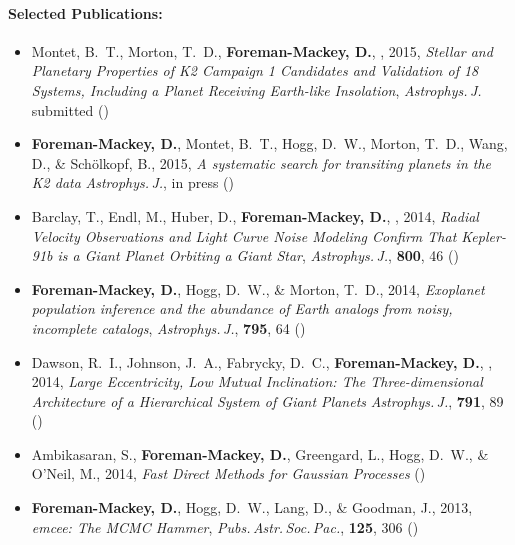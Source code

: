 \documentclass[12pt]{article}
\begin{document}
\paragraph{Selected Publications:}
\begin{itemize}\setlength{\itemsep}{0pt}

\item Montet, B.~T., Morton, T.~D., {\bf Foreman-Mackey, D.}, \etal, 2015,
    \emph{Stellar and Planetary Properties of K2 Campaign 1 Candidates and
          Validation of 18 Systems, Including a Planet Receiving Earth-like
          Insolation}, \textit{Astrophys.\,J.} submitted ()

\item {\bf Foreman-Mackey, D.}, Montet, B.~T., Hogg, D.~W., Morton, T.~D.,
    Wang, D., \& Sch\"olkopf, B., 2015,
    \emph{A systematic search for transiting planets in the K2 data}
    \textit{Astrophys.\,J.}, in press ()

\item Barclay, T., Endl, M.,  Huber, D., {\bf Foreman-Mackey, D.}, \etal, 2014,
    \emph{Radial Velocity Observations and Light Curve Noise Modeling Confirm
          That Kepler-91b is a Giant Planet Orbiting a Giant Star},
    \textit{Astrophys.\,J.}, \textbf{800}, 46 ()

\item {\bf Foreman-Mackey, D.}, Hogg, D.~W., \& Morton, T.~D., 2014,
    \emph{Exoplanet population inference and the abundance of Earth analogs
          from noisy, incomplete catalogs},
    \textit{Astrophys.\,J.}, \textbf{795}, 64 ()

\item Dawson, R.~I., Johnson,  J.~A., Fabrycky, D.~C.,
    {\bf Foreman-Mackey, D.}, \etal, 2014,
    \emph{Large Eccentricity, Low Mutual Inclination: The Three-dimensional
          Architecture of a Hierarchical System of Giant Planets}
    \textit{Astrophys.\,J.}, \textbf{791}, 89 ()

\item Ambikasaran, S., {\bf Foreman-Mackey, D.}, Greengard, L., Hogg, D.~W.,
    \& O'Neil, M., 2014,
    \emph{Fast Direct Methods for Gaussian Processes} ()

\item {\bf Foreman-Mackey, D.}, Hogg, D.~W., Lang, D., \& Goodman, J., 2013,
    \emph{emcee: The MCMC Hammer},
    \textit{Pubs.\,Astr.\,Soc.\,Pac.}, \textbf{125}, 306 ()

\end{itemize}
\end{document}
